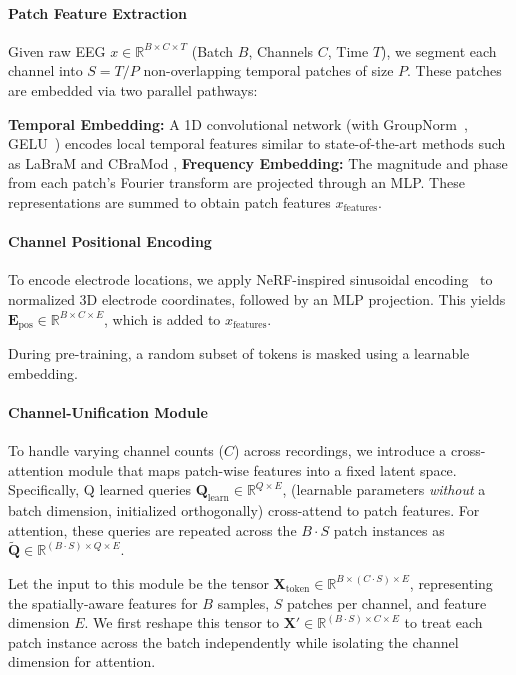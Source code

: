 \paragraph{Patch Feature Extraction}
Given raw EEG \(x \in \mathbb{R}^{B \times C \times T}\) (Batch \(B\), Channels \(C\), Time \(T\)), we segment each channel into \(S = T / P\) non-overlapping temporal patches of size \(P\). These patches are embedded via two parallel pathways:

\textbf{Temporal Embedding:} A 1D convolutional network (with GroupNorm~\citep{wu2018group}, GELU~\citep{hendrycks2016gaussian}) encodes local temporal features similar to state-of-the-art methods such as LaBraM\cite{jiang2024large} and CBraMod \cite{wang2024cbramod},
\textbf{Frequency Embedding:} The magnitude and phase from each patch's Fourier transform are projected through an MLP.
These representations are summed to obtain patch features \(x_\text{features}\).

\vspace{-3mm}
\paragraph{Channel Positional Encoding}
To encode electrode locations, we apply NeRF-inspired sinusoidal encoding~\cite{mildenhallNerf} to normalized 3D electrode coordinates, followed by an MLP projection. This yields $\mathbf{E}_{\text{pos}} \in \mathbb{R}^{B \times C \times E}$, which is added to $x_{\text{features}}$. 

During pre-training, a random subset of tokens is masked using a learnable embedding. 

\paragraph{Channel-Unification Module}
\label{subsubsec:channel_unification}
To handle varying channel counts (\(C\)) across recordings, we introduce a cross-attention module that maps patch-wise features into a fixed latent space. Specifically, Q learned queries $\mathbf{Q}_{\text{learn}} \in \mathbb{R}^{Q \times E}$, (learnable parameters \emph{without} a batch dimension, initialized orthogonally) cross-attend to patch features. For attention, these queries are repeated across the $B \cdot S$ patch instances as $\tilde{\mathbf{Q}} \in \mathbb{R}^{(B \cdot S) \times Q \times E}$.

Let the input to this module be the tensor \( \mathbf{X}_\text{token} \in \mathbb{R}^{B \times (C \cdot S) \times E} \), representing the spatially-aware features for \(B\) samples, \(S\) patches per channel, and feature dimension \(E\). We first reshape this tensor to \( \mathbf{X}' \in \mathbb{R}^{(B \cdot S) \times C \times E} \) to treat each patch instance across the batch independently while isolating the channel dimension for attention.

